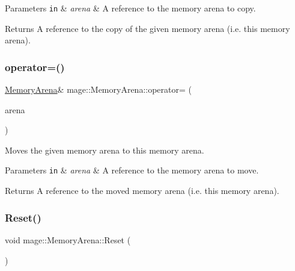 \begin{DoxyParams}[1]{Parameters}
\mbox{\tt in}  & {\em arena} & A reference to the memory arena to copy. \\
\hline
\end{DoxyParams}
\begin{DoxyReturn}{Returns}
A reference to the copy of the given memory arena (i.\+e. this memory arena). 
\end{DoxyReturn}
\mbox{\label{classmage_1_1_memory_arena_aa4b80a917a838a1ca3788f906723d273}} 
\subsubsection{\texorpdfstring{operator=()}{operator=()}\hspace{0.1cm}{\footnotesize\ttfamily [2/2]}}
{\footnotesize\ttfamily \mbox{\hyperlink{classmage_1_1_memory_arena}{Memory\+Arena}}\& mage\+::\+Memory\+Arena\+::operator= (\begin{DoxyParamCaption}\item[{\mbox{\hyperlink{classmage_1_1_memory_arena}{Memory\+Arena}} \&\&}]{arena }\end{DoxyParamCaption})\hspace{0.3cm}{\ttfamily [delete]}}

Moves the given memory arena to this memory arena.


\begin{DoxyParams}[1]{Parameters}
\mbox{\tt in}  & {\em arena} & A reference to the memory arena to move. \\
\hline
\end{DoxyParams}
\begin{DoxyReturn}{Returns}
A reference to the moved memory arena (i.\+e. this memory arena). 
\end{DoxyReturn}
\mbox{\label{classmage_1_1_memory_arena_a117b74c7bd5dfb28dfdaae6cab253491}} 
\subsubsection{\texorpdfstring{Reset()}{Reset()}}
{\footnotesize\ttfamily void mage\+::\+Memory\+Arena\+::\+Reset (\begin{DoxyParamCaption}{ }\end{DoxyParamCaption})}

